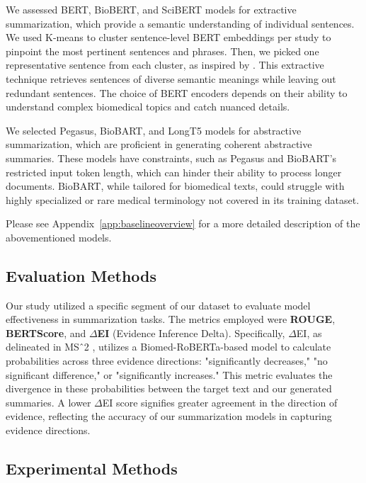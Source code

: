 \documentclass[11pt]{article}
\begin{document}
We assessed BERT\cite{devlin2019bert}, BioBERT\cite{Lee_2019}, and SciBERT\cite{beltagy2019scibert} models for extractive summarization, which provide a semantic understanding of individual sentences. We used K-means to cluster sentence-level BERT embeddings per study to pinpoint the most pertinent sentences and phrases. Then, we picked one representative sentence from each cluster, as inspired by \cite{miller2019leveraging}. This extractive technique retrieves sentences of diverse semantic meanings while leaving out redundant sentences. The choice of BERT encoders depends on their ability to understand complex biomedical topics and catch nuanced details.

We selected Pegasus\cite{zhang2020pegasus}, BioBART\cite{yuan2022biobart}, and LongT5\cite{guo2022longt5} models for abstractive summarization, which are proficient in generating coherent abstractive summaries. These models have constraints, such as Pegasus and BioBART's restricted input token length, which can hinder their ability to process longer documents. BioBART, while tailored for biomedical texts, could struggle with highly specialized or rare medical terminology not covered in its training dataset.

Please see Appendix~\ref{app:baselineoverview} for a more detailed description of the abovementioned models.

\subsection{Evaluation Methods}

Our study utilized a specific segment of our dataset to evaluate model effectiveness in summarization tasks. The metrics employed were \textbf{ROUGE}, \textbf{BERTScore}, and \textbf{\(\Delta\)EI} (Evidence Inference Delta). Specifically, \(\Delta\)EI, as delineated in MSˆ2 \cite{deyoung2021ms2}, utilizes a Biomed-RoBERTa-based model to calculate probabilities across three evidence directions: "significantly decreases," "no significant difference," or "significantly increases." This metric evaluates the divergence in these probabilities between the target text and our generated summaries. A lower \(\Delta\)EI score signifies greater agreement in the direction of evidence, reflecting the accuracy of our summarization models in capturing evidence directions.


\subsection{Experimental Methods}
\end{document}
